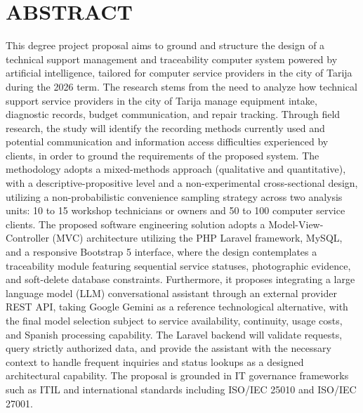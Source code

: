 \chapter*{ABSTRACT}

This degree project proposal aims to ground and structure the design of a technical support management and traceability computer system powered by artificial intelligence, tailored for computer service providers in the city of Tarija during the 2026 term. The research stems from the need to analyze how technical support service providers in the city of Tarija manage equipment intake, diagnostic records, budget communication, and repair tracking. Through field research, the study will identify the recording methods currently used and potential communication and information access difficulties experienced by clients, in order to ground the requirements of the proposed system. The methodology adopts a mixed-methods approach (qualitative and quantitative), with a descriptive-propositive level and a non-experimental cross-sectional design, utilizing a non-probabilistic convenience sampling strategy across two analysis units: 10 to 15 workshop technicians or owners and 50 to 100 computer service clients. The proposed software engineering solution adopts a Model-View-Controller (MVC) architecture utilizing the PHP Laravel framework, MySQL, and a responsive Bootstrap 5 interface, where the design contemplates a traceability module featuring sequential service statuses, photographic evidence, and soft-delete database constraints. Furthermore, it proposes integrating a large language model (LLM) conversational assistant through an external provider REST API, taking Google Gemini as a reference technological alternative, with the final model selection subject to service availability, continuity, usage costs, and Spanish processing capability. The Laravel backend will validate requests, query strictly authorized data, and provide the assistant with the necessary context to handle frequent inquiries and status lookups as a designed architectural capability. The proposal is grounded in IT governance frameworks such as ITIL and international standards including ISO/IEC 25010 and ISO/IEC 27001.